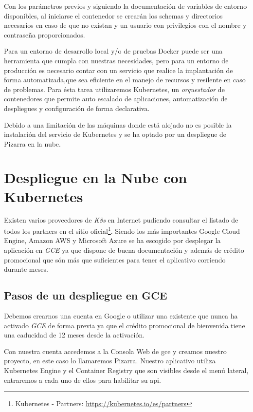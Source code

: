 \documentclass[11pt,spanish,listoffigures,listoftables]{tfgetsinf}
\begin{document}
Con los parámetros previos y siguiendo la documentación de variables de entorno disponibles, al iniciarse el contenedor se crearán los \foreignlanguage{english}{schemas} y directorios necesarios en caso de que no existan y un usuario con privilegios con el nombre y contraseña proporcionados.

Para un entorno de desarrollo local y/o de pruebas Docker puede ser una herramienta que cumpla con nuestras necesidades, pero para un entorno de producción es necesario contar con un servicio que realice la implantación de forma automatizada,que sea eficiente en el manejo de recursos y resilente en caso de problemas. Para ésta tarea utilizaremos Kubernetes, un \textit{orquestador} de contenedores que permite auto escalado de aplicaciones, automatización de despliegues y configuración de forma declarativa.

Debido a una limitación de las máquinas donde está alojado \kahan no es posible la instalación del servicio de Kubernetes y se ha optado por un despliegue de Pizarra en la nube.

\section{Despliegue en la Nube con Kubernetes}

Existen varios proveedores de \textit{K8s} en Internet pudiendo consultar el listado de todos los partners en el sitio oficial\footnote{Kubernetes - Partners: \url{https://kubernetes.io/es/partners}}. Siendo los más importantes Google Cloud Engine, Amazon AWS y Microsoft Azure se ha escogido por desplegar la aplicación en \textit{GCE} ya que dispone de buena documentación y además  de crédito promocional que són más que suficientes para tener el aplicativo corriendo durante meses.

\subsection{Pasos de un despliegue en GCE}

Debemos crearnos una cuenta en Google o utilizar una existente que nunca ha activado \textit{GCE} de forma previa ya que el crédito promocional de bienvenida tiene una caducidad de 12 meses desde la activación.

Con nuestra cuenta accedemos a la Consola Web de \acrshort{gce} y creamos nuestro proyecto, en este caso lo llamaremos Pizarra. Nuestro aplicativo utiliza Kubernetes Engine y el Container Registry que son visibles desde el menú lateral, entraremos a cada uno de ellos para habilitar su \acrshort{api}.
\end{document}
